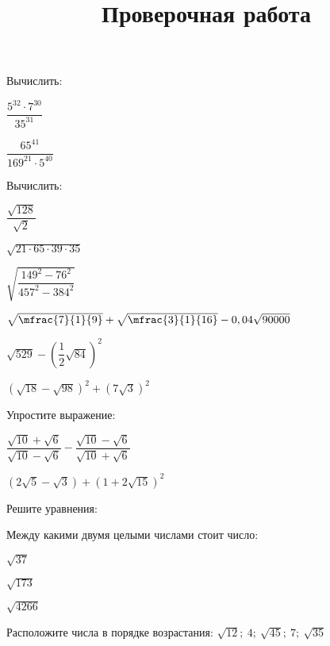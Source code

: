 %
%
\newpage
\title{Проверочная работа}
	\begin{listofex}
	\item Вычислить:
	\begin{enumcols}[itemcolumns=2]
		\item \( \dfrac{5^{32}\cdot7^{30}}{35^{31}} \)
		\item \( \dfrac{65^{41}}{169^{21}\cdot5^{40}} \)
	\end{enumcols}
	\item Вычислить:
	\begin{enumcols}[itemcolumns=2]
		\item \( \dfrac{\sqrt{128}}{\sqrt{2}} \)
		\item \( \sqrt{21\cdot65\cdot39\cdot35} \)
		\item \( \sqrt{\dfrac{149^2-76^2}{457^2-384^2}} \)
		\item \( \sqrt{\mfrac{7}{1}{9}}+\sqrt{\mfrac{3}{1}{16}}-0,04\sqrt{90000} \)
		\item \( \sqrt{529}-\left( \dfrac{1}{2}\sqrt{84} \right)^2 \)
		\item \( (\sqrt{18}-\sqrt{98})^2+(7\sqrt{3})^2 \)
	\end{enumcols}
	\item Упростите выражение:
	\begin{enumcols}[itemcolumns=2]
		\item \(\dfrac{\sqrt{10}+\sqrt{6}}{\sqrt{10}-\sqrt{6}}-\dfrac{\sqrt{10}-\sqrt{6}}{\sqrt{10}+\sqrt{6}} \)
		\item \( (2\sqrt{5}-\sqrt{3})+(1+2\sqrt{15})^2 \)
	\end{enumcols}
	\item {}
	\item Решите уравнения:
	\begin{enumcols}[itemcolumns=3]
		\item {}
		\item {}
		\item {}
		\item {}
		\item {}
		\item {}
	\end{enumcols}
	\item Между какими двумя целыми числами стоит число:
	\begin{enumcols}[itemcolumns=3]
		\item \( \sqrt{37} \)
		\item \( \sqrt{173} \)
		\item \( \sqrt{4266} \)
	\end{enumcols}
	\item Расположите числа в порядке возрастания: \quad \( \sqrt{12};\ 4; \ \sqrt{45};\ 7;\ \sqrt{35}  \)
	\end{listofex}